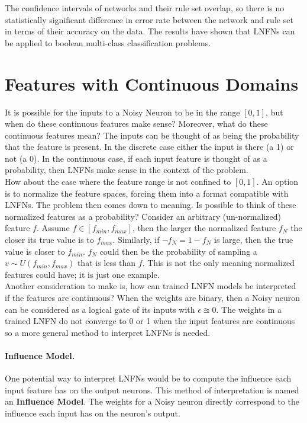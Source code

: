  The confidence intervals of networks and their rule set overlap, so there is no statistically significant difference in error rate between the network and rule set in terms of their accuracy on the data. The results have shown that LNFNs can be applied to boolean multi-class classification problems.

\section{Features with Continuous Domains}
It is possible for the inputs to a Noisy Neuron to be in the range $[0,1]$, but when do these continuous features make sense? Moreover, what do these continuous features mean? The inputs can be thought of as being the probability that the feature is present. In the discrete case either the input is there (a 1) or not (a 0). In the continuous case, if each input feature is thought of as a probability, then LNFNs make sense in the context of the problem.\\

How about the case where the feature range is not confined to $[0,1]$. An option is to normalize the feature spaces, forcing them into a format compatible with LNFNs. The problem then comes down to meaning. Is possible to think of these normalized features as a probability? Consider an arbitrary (un-normalized) feature $f$. Assume $f \in [f_{min}, f_{max}]$, then the larger the normalized feature $f_N$ the closer its true value is to $f_{max}$. Similarly, if $\lnot f_N = 1 - f_N$ is large, then the true value is closer to $f_{min}$. $f_N$ could then be the probability of sampling a $v \sim U(f_{min}, f_{max})$ that is less than $f$. This is not the only meaning normalized features could have; it is just one example.\\

Another consideration to make is, how can trained LNFN models be interpreted if the features are continuous? When the weights are binary, then a Noisy neuron can be considered as a logical gate of its inputs with $\epsilon \approxeq 0$. The weights in a trained LNFN do not converge to 0 or 1 when the input features are continuous so a more general method to interpret LNFNs is needed.

\paragraph{Influence Model.}
One potential way to interpret LNFNs would be to compute the influence each input feature has on the output neurons. This method of interpretation is named an \textbf{Influence Model}.  The weights for a Noisy neuron directly correspond to the influence each input has on the neuron's output. 

